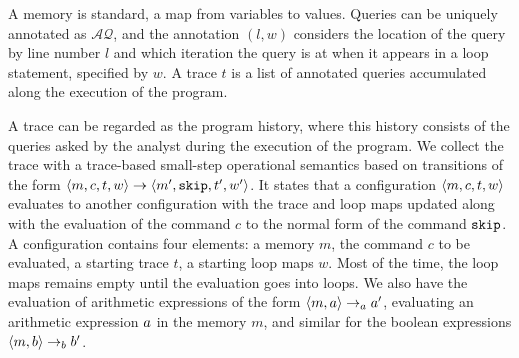  A memory is standard, a map from variables to values. Queries can be uniquely annotated as $\mathcal{AQ}$, and the annotation $(l,w)$ considers the location of the query by line number $l$ and which iteration the query is at when it appears in a loop statement, specified by $w$. A trace $t$ is a list of annotated queries accumulated along the execution of the program. 
 
A trace can be regarded as the program history, where this history consists of the queries asked by the analyst during the execution of the program. We collect the trace with a trace-based small-step operational semantics based on transitions of the form $ \langle m,c, t, w \rangle \to \langle m', \mathtt{skip}, t', w' \rangle $. It states that a configuration $\langle m, c, t,w \rangle$ evaluates to another configuration with the trace and loop maps updated along with the evaluation of the command $c$ to the normal form of the command $\mathtt{skip}$.  A configuration contains four elements: a memory $m$, the command $c$ to be evaluated, a starting trace $t$, a starting loop maps $w$. Most of the time, the loop maps remains empty until the evaluation goes into loops.  We also have the evaluation of arithmetic expressions of the form $\langle m,a \rangle \rightarrow_a a' $, evaluating an arithmetic expression $a$ in the memory $m$, and similar for the boolean expressions $\langle m, b \rangle \rightarrow_b b'$.   

